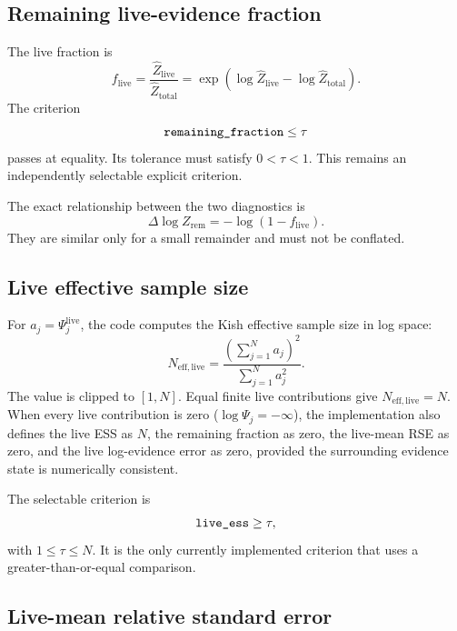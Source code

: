 \documentclass[11pt,a4paper]{article}
\newcommand{\code}[1]{\texttt{\detokenize{#1}}}
\begin{document}
\subsection{Remaining live-evidence fraction}

The live fraction is
\begin{equation}
  f_{\mathrm{live}}
  = \frac{\widehat Z_{\mathrm{live}}}
         {\widehat Z_{\mathrm{total}}}
  = \exp\left(
      \log\widehat Z_{\mathrm{live}}
      -\log\widehat Z_{\mathrm{total}}
    \right).
  \label{eq:remaining}
\end{equation}
The criterion
\[
  \code{remaining_fraction}\leq\tau
\]
passes at equality.  Its tolerance must satisfy \(0<\tau<1\).  This remains an
independently selectable explicit criterion.

The exact relationship between the two diagnostics is
\begin{equation}
  \Delta\log Z_{\mathrm{rem}}
  = -\log(1-f_{\mathrm{live}}).
\end{equation}
They are similar only for a small remainder and must not be conflated.

\subsection{Live effective sample size}

For \(a_j=\Psi_j^{\mathrm{live}}\), the code computes the Kish effective sample
size in log space:
\begin{equation}
  N_{\mathrm{eff,live}}
  = \frac{\left(\sum_{j=1}^{N}a_j\right)^2}
         {\sum_{j=1}^{N}a_j^2}.
  \label{eq:live-ess}
\end{equation}
The value is clipped to \([1,N]\).  Equal finite live contributions give
\(N_{\mathrm{eff,live}}=N\).  When every live contribution is zero
(\(\log\Psi_j=-\infty\)), the implementation also defines the live ESS as
\(N\), the remaining fraction as zero, the live-mean RSE as zero, and the live
log-evidence error as zero, provided the surrounding evidence state is
numerically consistent.

The selectable criterion is
\[
  \code{live_ess}\geq\tau,
\]
with \(1\leq\tau\leq N\).  It is the only currently implemented criterion that
uses a greater-than-or-equal comparison.

\subsection{Live-mean relative standard error}
\end{document}
